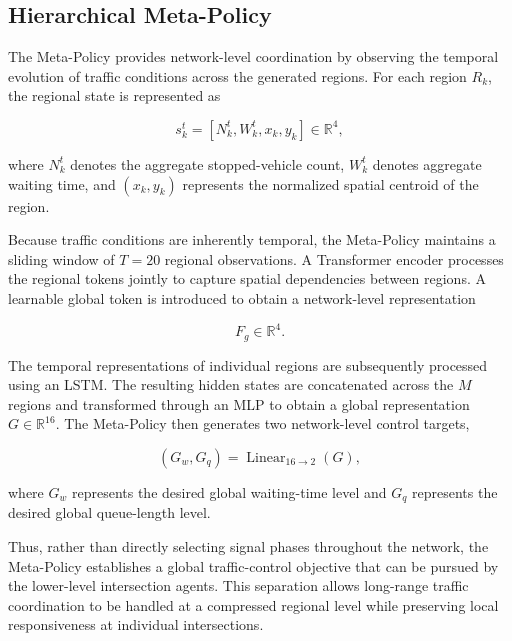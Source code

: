 \documentclass[3p,times]{elsarticle}
\theoremstyle{plain}
\theoremstyle{definition}
\begin{document}

\subsection{Hierarchical Meta-Policy}\label{subsec3-6}

The Meta-Policy provides network-level coordination by observing the
temporal evolution of traffic conditions across the generated regions.
For each region $R_k$, the regional state is represented as

\begin{equation}
s_k^t = \left[N_k^t, W_k^t, x_k, y_k\right] \in \mathbb{R}^{4},
\end{equation}

where $N_k^t$ denotes the aggregate stopped-vehicle count, $W_k^t$
denotes aggregate waiting time, and $(x_k, y_k)$ represents the
normalized spatial centroid of the region.

Because traffic conditions are inherently temporal, the Meta-Policy
maintains a sliding window of $T = 20$ regional observations. A
Transformer encoder processes the regional tokens jointly to capture
spatial dependencies between regions. A learnable global token is
introduced to obtain a network-level representation

\begin{equation}
F_g \in \mathbb{R}^{4}.
\end{equation}

The temporal representations of individual regions are subsequently
processed using an LSTM. The resulting hidden states are concatenated
across the $M$ regions and transformed through an MLP to obtain a
global representation $G \in \mathbb{R}^{16}$. The Meta-Policy then
generates two network-level control targets,

\begin{equation}
(G_w, G_q) = \operatorname{Linear}_{16\rightarrow2}(G),
\end{equation}

where $G_w$ represents the desired global waiting-time level and
$G_q$ represents the desired global queue-length level.

Thus, rather than directly selecting signal phases throughout the
network, the Meta-Policy establishes a global traffic-control
objective that can be pursued by the lower-level intersection agents.
This separation allows long-range traffic coordination to be handled
at a compressed regional level while preserving local responsiveness
at individual intersections.
\end{document}
